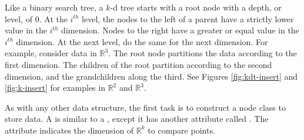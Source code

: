 Like a binary search tree, a $k$-d tree starts with a root node with a depth, or level, of 0.
At the $i^{th}$ level, the nodes to the left of a parent have a strictly lower value in the $i^{th}$ dimension.
Nodes to the right have a greater or equal value in the $i^{th}$ dimension.
At the next level, do the same for the next dimension.
For example, consider data in $\mathbb{R}^3$.
The root node partitions the data according to the first dimension.
The children of the root partition according to the second dimension, and the grandchildren along the third.
See Figures \ref{fig:kdt-insert} and \ref{fig:k-insert} for examples in $\mathbb{R}^2$ and $\mathbb{R}^3$.

As with any other data structure, the first task is to construct a node class to store data.
A  is similar to a , except it has another attribute called .
The  attribute indicates the dimension of $\mathbb{R}^k$ to compare points.

